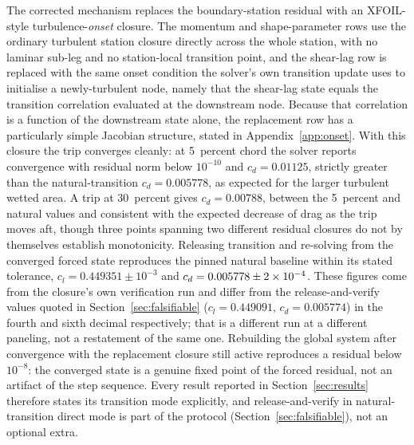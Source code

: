 The corrected mechanism replaces the boundary-station residual with an
XFOIL-style turbulence-\emph{onset} closure. The momentum and shape-parameter
rows use the ordinary turbulent station closure directly across the whole
station, with no laminar sub-leg and no station-local transition point, and
the shear-lag row is replaced with the same onset condition the solver's own
transition update uses to initialise a newly-turbulent node, namely that the
shear-lag state equals the transition correlation evaluated at the downstream
node. Because that correlation is a function of the downstream state alone,
the replacement row has a particularly simple Jacobian structure, stated in
Appendix~\ref{app:onset}. With this closure the trip converges cleanly: at
5~percent chord the solver reports convergence with residual norm below
$10^{-10}$ and $c_d=0.01125$, strictly greater than the natural-transition
$c_d=0.005778$, as expected for the larger turbulent wetted area. A trip at
30~percent gives $c_d=0.00788$, between the 5~percent and natural values and
consistent with the expected decrease of drag as the trip moves aft, though
three points spanning two different residual closures do not by themselves
establish monotonicity. Releasing transition and re-solving from the converged
forced state reproduces the pinned natural baseline within its stated
tolerance, $c_l=0.449351\pm10^{-3}$ and $c_d=0.005778\pm2\times10^{-4}$. These
figures come from the closure's own verification run and differ from the
release-and-verify values quoted in Section~\ref{sec:falsifiable}
($c_l=0.449091$, $c_d=0.005774$) in the fourth and sixth decimal respectively;
that is a different run at a different paneling, not a restatement of the same
one. Rebuilding the global system after convergence with the replacement
closure still active reproduces a residual below $10^{-8}$: the converged
state is a genuine fixed point of the forced residual, not an artifact of the
step sequence. Every result reported in Section~\ref{sec:results} therefore
states its transition mode explicitly, and release-and-verify in
natural-transition direct mode is part of the protocol
(Section~\ref{sec:falsifiable}), not an optional extra.

